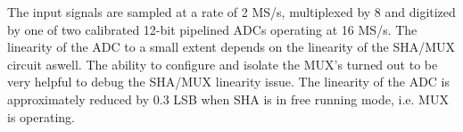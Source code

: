 \label{sec:5.4}


The input signals are sampled at a rate of 2 MS/s, multiplexed by 8 and digitized by one of two calibrated 12-bit pipelined ADCs operating at 16 MS/s. The linearity of the ADC to a small extent depends on the linearity of the SHA/MUX circuit aswell. 
The ability to configure and isolate the MUX's turned out to be very helpful to debug the SHA/MUX linearity issue. The linearity of the ADC is approximately reduced by 0.3 LSB when SHA is in free running mode, i.e. MUX is operating. 


